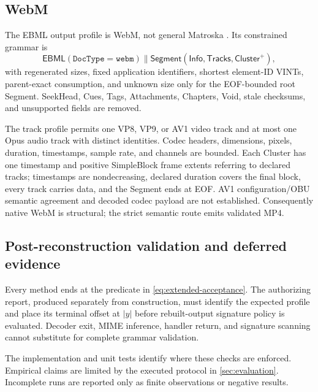 \subsection{WebM}\label{subsec:webm-method}

The EBML output profile is WebM, not general Matroska
\cite{rfc8794,rfc9559,webmContainer,matroskaElements}. Its constrained grammar
is
\begin{equation}
 \mathsf{EBML}(\mathtt{DocType=webm})\parallel
 \mathsf{Segment}(\mathsf{Info},\mathsf{Tracks},\mathsf{Cluster}^{+}),
 \label{eq:webm-grammar}
\end{equation}
with regenerated sizes, fixed application identifiers, shortest element-ID
VINTs, parent-exact consumption, and unknown size only for the EOF-bounded root
Segment. SeekHead, Cues, Tags, Attachments, Chapters, Void, stale checksums, and
unsupported fields are removed.

The track profile permits one VP8, VP9, or AV1 video track and at most one Opus
audio track with distinct identities. Codec headers, dimensions, pixels,
duration, timestamps, sample rate, and channels are bounded. Each Cluster has
one timestamp and positive SimpleBlock frame extents referring to declared
tracks; timestamps are nondecreasing, declared duration covers the final block,
every track carries data, and the Segment ends at EOF. AV1 configuration/OBU
semantic agreement and decoded codec payload are not established. Consequently
native WebM is structural; the strict semantic route emits validated MP4.

\subsection{Post-reconstruction validation and deferred evidence}
\label{subsec:post-reconstruction-validation}

Every method ends at the predicate in \cref{eq:extended-acceptance}. The
authorizing report, produced separately from construction, must identify the
expected profile and place its terminal offset at $|y|$ before rebuilt-output
signature policy is evaluated. Decoder exit, MIME inference, handler return,
and signature scanning cannot substitute for complete grammar validation.

The implementation and unit tests identify where these checks are enforced.
Empirical claims are limited by the executed protocol in \cref{sec:evaluation}.
Incomplete runs are reported only as finite observations or negative results.

